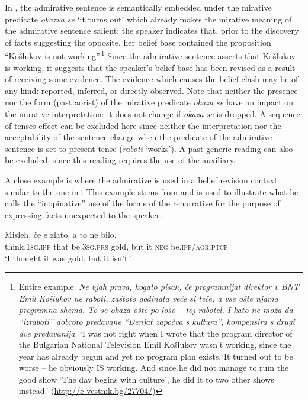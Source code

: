 \documentclass[output=paper,
colorlinks,
citecolor=brown,
newtxmath
]{langscibook}
\begin{document}
\noindent In , the admirative sentence is semantically embedded under the mirative predicate \textit{okazva se} `it turns out' which already makes the mirative meaning of the admirative sentence salient: the speaker indicates that, prior to the discovery of facts suggesting the opposite, her belief base contained the proposition ``Košlukov is not working''.\footnote{Entire example: \textit{Ne bjah prava, kogato pisah, če programnijat direktor v BNT Emil Košlukov ne raboti, zaštoto godinata veče si teče, a vse ošte njama programna shema. To se okaza ošte po-lošo -- toj rabotel. I kato ne moža da ``izraboti'' dobroto predavane ``Denjat započva s kultura'', kompensira s drugi dve predavanija}.
`I was not right when I wrote that the program director of the Bulgarian National Television Emil Košlukov wasn't working, since the year has already begun and yet no program plan exists. It turned out to be worse -- he obviously IS working. And since he did not manage to ruin the good show `The day begins with culture', he did it to two other shows instead.' \hfill (\url{http://e-vestnik.bg/27704/})} Since the admirative sentence asserts that Košlukov is working, it suggests that the speaker's belief base has been revised as a result of receiving some evidence. The evidence which causes the belief clash may be of any kind: reported, inferred, or directly observed. Note that neither the presence nor the form (past aorist) of the mirative predicate \textit{okaza se} have an impact on the mirative interpretation: it does not change if \textit{okaza se} is dropped. A sequence of tenses effect can be excluded here since neither the interpretation nor the acceptability of the sentence change when the predicate of the admirative sentence is set to present tense (\textit{raboti} `works'). A past generic reading can also be excluded, since this reading requires the use of the auxiliary. %

A close example is  where the admirative is used in a belief revision context similar to the one in . This example stems from \citet[68]{Andrejcin1938} and is used to illustrate what he calls the ``inopinative'' use of the forms of the renarrative for the purpose of expressing facts unexpected to the speaker.

\ea \label{ex:misleh}
\gll Misleh, če e zlato, a to ne bilo.\\
think.\textsc{1sg.ipf} that be.\textsc{3sg.prs} gold, but it \textsc{neg} be.\textsc{ipf/aor.ptcp} \\
\glt `I thought it was gold, but it isn't.'
\z
\end{document}
